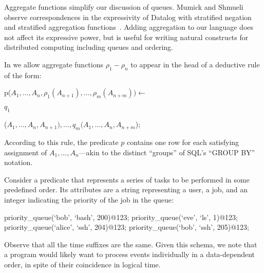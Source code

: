 Aggregate functions simplify our discussion of queues.  Mumick and Shmueli observe correspondences in the expressivity of Datalog with stratified negation and stratified aggregation functions~\cite{mumickshmueli}.  Adding aggregation to our language does not affect its expressive power, but is useful for writing natural constructs for distributed computing including queues and ordering.  

In \slang we allow aggregate functions $\rho_1 - \rho_n$ to appear in the head
of a deductive rule of the form:


\begin{dedalus}
p($A_1, \ldots, A_n, \rho_1(A_{n+1}), \ldots, \rho_m(A_{n+m})) \leftarrow$
\end{dedalus}

\hspace{5mm}
$q_1$
\begin{dedalus}
($A_1, \ldots, A_{n}, A_{n+1}), \ldots, q_m(A_1, \ldots, A_{n}, A_{n+m}$);
\end{dedalus}

According to this rule, the predicate $p$ contains one row for each satisfying assignment of $A_1, \ldots, A_n$---akin to the distinct ``groups'' of SQL's ``GROUP BY'' notation.



Consider a predicate  that represents a series of tasks to be performed in some predefined order.  Its attributes are a string representing a user, a job, and an integer
indicating the priority of the job in the queue:

\begin{Dedalus}
priority\_queue(`bob', `bash', 200)@123;
priority\_queue(`eve', `ls', 1)@123;
priority\_queue(`alice', `ssh', 204)@123;
priority\_queue(`bob', `ssh', 205)@123;
\end{Dedalus}

Observe that all the time suffixes are the same.  
Given this schema, we note that a program would likely want to process
 events individually in a data-dependent order, in
spite of their coincidence in logical time.  


